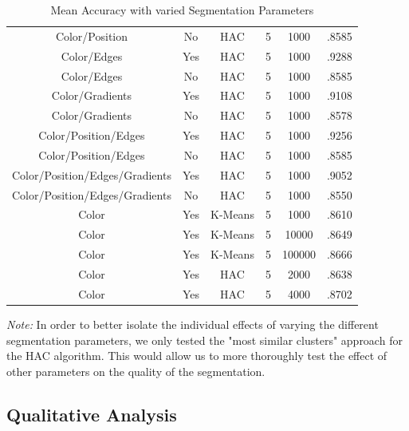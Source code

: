 \documentclass[12pt]{article}
\begin{document}
\begin{table}[H]
\begin{adjustbox}{width=\columnwidth,center}
\begin{tabular}{c c c c c c}
			Color/Position & No & HAC & 5 & 1000 & .8585 \\
			Color/Edges & Yes & HAC & 5 & 1000 & .9288 \\
			Color/Edges & No & HAC & 5 & 1000 & .8585 \\
			Color/Gradients & Yes & HAC & 5 & 1000 & .9108 \\
			Color/Gradients & No & HAC & 5 & 1000 & .8578 \\
			Color/Position/Edges & Yes & HAC & 5 & 1000 & .9256 \\
			Color/Position/Edges & No & HAC & 5 & 1000 & .8585 	\\
			Color/Position/Edges/Gradients & Yes & HAC & 5 & 1000 & .9052 \\
			Color/Position/Edges/Gradients & No & HAC & 5 & 1000 & .8550 \\
			Color & Yes & K-Means & 5 & 1000 & .8610 \\
			Color & Yes & K-Means & 5 & 10000 & .8649 \\
			Color & Yes & K-Means & 5 & 100000 & .8666 \\
			Color & Yes & HAC & 5 & 2000 & .8638 \\
			Color & Yes & HAC & 5 & 4000 & .8702 \\ \hline
		\end{tabular}
	\end{adjustbox}
	\caption{Mean Accuracy with varied Segmentation Parameters}
\end{table}

\textit{Note:} In order to better isolate the individual effects of varying the different segmentation parameters, we only tested the "most similar clusters" approach for the HAC algorithm. This would allow us to more thoroughly test the effect of other parameters on the quality of the segmentation.

\subsection{Qualitative Analysis}
\end{document}
